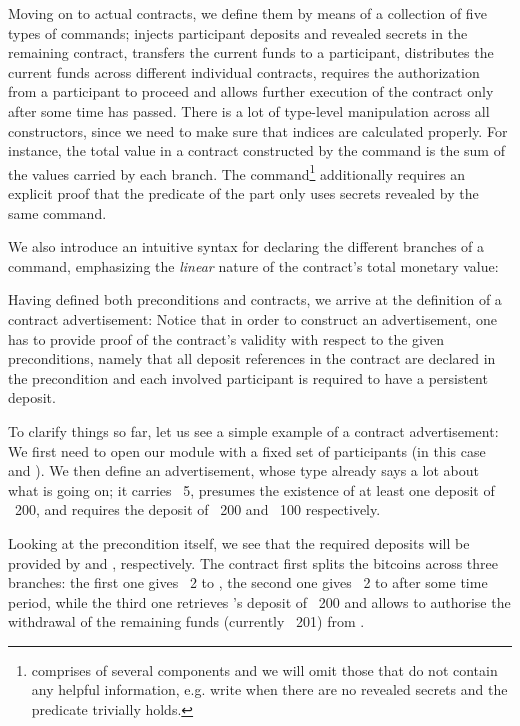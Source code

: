 \documentclass[acmsmall,nonacm=true,screen=true]{acmart}
\begin{document}
Moving on to actual contracts, we define them by means of a collection of five types of commands;
\inlinePut{} injects participant deposits and revealed secrets in the remaining contract,
\inlineWithdraw{} transfers the current funds to a participant,
\inlineSplit{} distributes the current funds across different individual contracts,
\inlineAuthDecoration{} requires the authorization from a participant to proceed
and \inlineTimeDecoration{} allows further execution of the contract only after some time has passed.
\BITcontracts{}
There is a lot of type-level manipulation across all constructors, since we need to make sure that indices are
calculated properly. For instance, the total value in a contract constructed by the \inlineSplit{} command is the 
sum of the values carried by each branch.
The \inlinePut{} command\footnote{
\inlinePut{} comprises of several components and we will omit those that do not contain any helpful information,
e.g. write \inlineSimplePut{} when there are no revealed secrets and the predicate trivially holds.
} additionally requires an explicit proof that the predicate
of the \inlineIf{} part only uses secrets revealed by the same command.

We also introduce an intuitive syntax for declaring the different branches of a \inlineSplit{} command, emphasizing the
\textit{linear} nature of the contract's total monetary value:
\BITlollipop{}

Having defined both preconditions and contracts, we arrive at the definition of a contract advertisement:
\BITadvertisements{}
Notice that in order to construct an advertisement, one has to provide proof of the contract's validity with respect to
the given preconditions, namely that all deposit references in the contract are declared in the precondition
and each involved participant is required to have a persistent deposit.

To clarify things so far, let us see a simple example of a contract advertisement:
\BITexampleAdvertisement{}
We first need to open our module with a fixed set of participants (in this case \inlineA{} and \inlineB{}).
We then define an advertisement, whose type already says a lot about what is going on;
it carries \bitcoin ~5, presumes the existence of at least one deposit of \bitcoin ~200, and requires the deposit
of \bitcoin ~200 and \bitcoin ~100 respectively.

Looking at the precondition itself, we see that the required deposits will be provided by \inlineB{} and \inlineA{}, respectively.
The contract first splits the bitcoins across three branches:
the first one gives \bitcoin ~2 to \inlineB{}, the second one gives \bitcoin ~2 to \inlineA{} after some time period,
while the third one retrieves \inlineB{}'s deposit of \bitcoin ~200 and allows \inlineB{} to authorise the
withdrawal of the remaining funds (currently \bitcoin ~201) from \inlineA{}.
\end{document}
